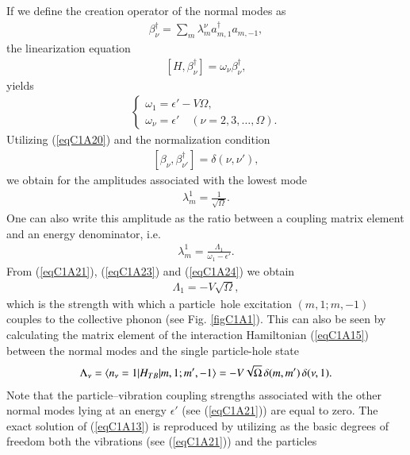 If we define the creation operator of the normal modes as
 \begin{align}\label{eqC1A19} 
\beta^\dagger_\nu=\sum_m \lambda_m^\nu a_{m,1}^\dagger a_{m,-1},
 \end{align}
the linearization equation
 \begin{align}\label{eqC1A20} 
[H,\beta_\nu^\dagger]=\omega_\nu\beta^\dagger_\nu,
 \end{align}
yields
 \begin{align}\label{eqC1A21} 
\left\{\begin{array}{l}
 \omega_1=\epsilon'-V\Omega,\\ 
\omega_\nu=\epsilon'\quad (\nu=2,3,\dots,\Omega).
\end{array} \right.
 \end{align}
Utilizing (\ref{eqC1A20}) and the normalization condition
 \begin{align}\label{eqC1A22} 
[\beta_\nu,\beta^\dagger_{\nu'}]=\delta(\nu,\nu'),
 \end{align}
we obtain for the amplitudes associated with the lowest mode
 \begin{align}\label{eqC1A23} 
\lambda_m^1=\frac{1}{\sqrt{\Omega}}.
 \end{align}
One can also write this amplitude as the ratio between a coupling matrix
element and an energy denominator, i.e.
 \begin{align}\label{eqC1A24} 
\lambda_m^1=\frac{\Lambda_1}{\omega_1-\epsilon'}.
 \end{align}
From (\ref{eqC1A21}), (\ref{eqC1A23}) and (\ref{eqC1A24}) we obtain
 \begin{align}\label{eqC1A25} 
\Lambda_1=-V\sqrt{\Omega},
 \end{align}
which is the strength with which a particle~hole excitation $(m, 1; m, -1)$
couples to the collective phonon (see Fig. \ref{figC1A1}). This can also be seen by calculating
the matrix element of the interaction Hamiltonian (\ref{eqC1A15}) between the normal
modes and the single particle-hole state
 \begin{align}\label{eqC1A26} 
\Lambda_\nu=\langle {n_\nu=1|H_{TB}|m,1;m',-1} \rangle=-V\sqrt{\Omega}\,\delta(m,m')\,\delta(\nu,1).
 \end{align}
Note that the particle--vibration coupling strengths associated with the other
normal modes lying at an energy $\epsilon'$ (see (\ref{eqC1A21})) are equal to zero. The exact solution of (\ref{eqC1A13}) is reproduced by utilizing
as the basic degrees of freedom both the vibrations (see (\ref{eqC1A21})) and the particles
